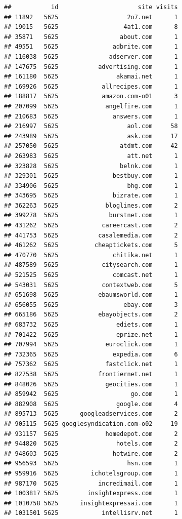 \documentclass[
]{article}
\begin{document}
\begin{verbatim}
##           id                      site visits
## 11892   5625                   2o7.net      1
## 19015   5625                  4at1.com      8
## 35871   5625                 about.com      1
## 49551   5625               adbrite.com      1
## 116038  5625              adserver.com      1
## 147675  5625           advertising.com      1
## 161180  5625                akamai.net      1
## 169926  5625            allrecipes.com      1
## 188817  5625            amazon.com-o01      3
## 207099  5625             angelfire.com      1
## 210683  5625               answers.com      1
## 216997  5625                   aol.com     58
## 243989  5625                   ask.com     17
## 257050  5625                 atdmt.com     42
## 263983  5625                   att.net      1
## 323828  5625                 belnk.com      1
## 329301  5625               bestbuy.com      1
## 334906  5625                   bhg.com      1
## 343695  5625               bizrate.com      1
## 362263  5625             bloglines.com      2
## 399278  5625              burstnet.com      1
## 431262  5625            careercast.com      2
## 441753  5625           casalemedia.com      2
## 461262  5625          cheaptickets.com      5
## 470770  5625               chitika.net      1
## 487589  5625            citysearch.com      1
## 521525  5625               comcast.net      1
## 543031  5625            contextweb.com      5
## 651698  5625           ebaumsworld.com      1
## 656055  5625                  ebay.com      3
## 665186  5625           ebayobjects.com      2
## 683732  5625                ediets.com      1
## 701422  5625                eprize.net      1
## 707994  5625             euroclick.com      1
## 732365  5625               expedia.com      6
## 757362  5625             fastclick.net      1
## 827538  5625           frontiernet.net      1
## 848026  5625             geocities.com      1
## 859942  5625                    go.com      1
## 882908  5625                google.com      4
## 895713  5625      googleadservices.com      2
## 905115  5625 googlesyndication.com-o02     19
## 931157  5625             homedepot.com      2
## 944820  5625                hotels.com      2
## 948603  5625               hotwire.com      2
## 956593  5625                   hsn.com      1
## 959916  5625         ichotelsgroup.com      1
## 987170  5625           incredimail.com      1
## 1003817 5625        insightexpress.com      1
## 1010758 5625      insightexpressai.com      1
## 1031501 5625            intellisrv.net      1

\end{verbatim}
\end{document}
